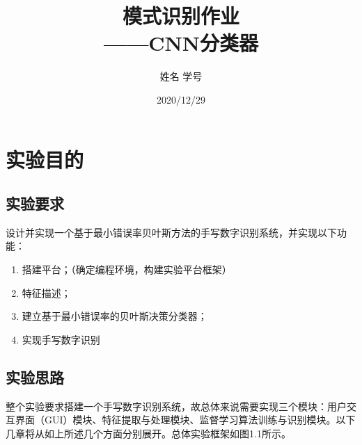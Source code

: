 \documentclass[UTF8, a4paper, 12pt]{report}
\title{模式识别作业\\——CNN分类器}
\author{姓名 学号}
\date{2020/12/29}
\begin{document}
\maketitle %
\thispagestyle{empty} %
\clearpage %

\pagestyle{plain} %
\setcounter{page}{1} %
\tableofcontents %
\clearpage

\pagestyle{fancy} %
\setcounter{page}{1} %

\chapter{实验目的}
	\section{实验要求}
		设计并实现一个基于最小错误率贝叶斯方法的手写数字识别系统，并实现以下功能：
		\begin{enumerate}[itemindent=1em]
			\renewcommand{\labelenumi}{\theenumi)}
			\item 搭建平台；（确定编程环境，构建实验平台框架）
			\item 特征描述；
			\item 建立基于最小错误率的贝叶斯决策分类器；
			\item 实现手写数字识别
		\end{enumerate}

	\section{实验思路}
		整个实验要求搭建一个手写数字识别系统，故总体来说需要实现三个模块：用户交互界面（GUI）模块、特征提取与处理模块、监督学习算法训练与识别模块。以下几章将从如上所述几个方面分别展开。总体实验框架如图1.1所示。
\end{document}
